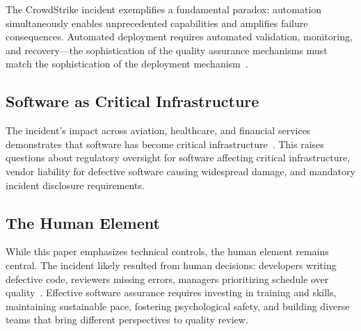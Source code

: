 \documentclass[sigconf,nonacm]{acmart}
\begin{document}
The CrowdStrike incident exemplifies a fundamental paradox: automation simultaneously
enables unprecedented capabilities and amplifies failure consequences. Automated deployment
requires automated validation, monitoring, and recovery---the sophistication of the quality
assurance mechanisms must match the sophistication of the deployment
mechanism~\cite{basiri2021teaching}.

\subsection{Software as Critical Infrastructure}

The incident's impact across aviation, healthcare, and financial services demonstrates that
software has become critical infrastructure~\cite{householder2020cvd}. This raises
questions about regulatory oversight for software affecting critical infrastructure,
vendor liability for defective software causing widespread damage, and mandatory incident
disclosure requirements.

\subsection{The Human Element}

While this paper emphasizes technical controls, the human element remains central. The
incident likely resulted from human decisions: developers writing defective code, reviewers
missing errors, managers prioritizing schedule over quality~\cite{rajapakse2022challenges}.
Effective software assurance requires investing in training and skills, maintaining
sustainable pace, fostering psychological safety, and building diverse teams that bring
different perspectives to quality review.
\end{document}
